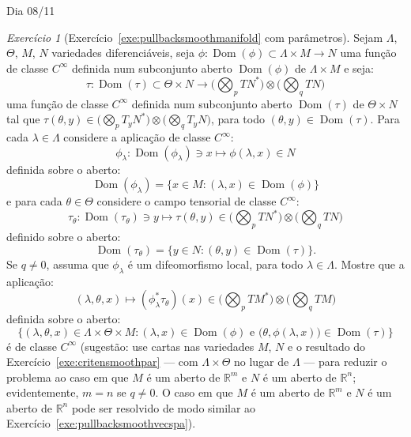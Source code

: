 \documentclass[oneside,11pt]{amsart}
\newcommand{\R}{\mathds R}
\DeclareMathOperator{\Dom}{Dom}
\theoremstyle{remark}\newtheorem{exercise}{Exercício}[section]
\theoremstyle{plain}\newtheorem{teo}{Teorema}[section]
\theoremstyle{plain}\newtheorem{lem}[teo]{Lema}
\theoremstyle{plain}\newtheorem{prop}[teo]{Proposição}
\theoremstyle{definition}\newtheorem{defin}[teo]{Definição}
\theoremstyle{remark}\newtheorem{rem}[teo]{Observação}
\theoremstyle{definition}\newtheorem{example}[teo]{Exemplo}
\numberwithin{equation}{section}
\begin{document}
\begin{section}{Dia 08/11}
\begin{exercise}[Exercício~\ref{exe:pullbacksmoothmanifold} com parâmetros]\label{exe:pullbackparametros}
Sejam $\Lambda$, $\Theta$, $M$, $N$ variedades diferenciáveis, seja $\phi:\Dom(\phi)\subset\Lambda\times M\to N$ uma função de classe $C^\infty$
definida num subconjunto aberto $\Dom(\phi)$ de $\Lambda\times M$ e seja:
\[\tau:\Dom(\tau)\subset\Theta\times N\longrightarrow\Big(\bigotimes_pTN^*\Big)\otimes\Big(\bigotimes_qTN\Big)\]
uma função de classe $C^\infty$ definida num subconjunto aberto $\Dom(\tau)$ de $\Theta\times N$ tal que
$\tau(\theta,y)\in\big(\bigotimes_pT_yN^*\big)\otimes\big(\bigotimes_qT_yN\big)$, para todo $(\theta,y)\in\Dom(\tau)$.
Para cada $\lambda\in\Lambda$ considere a aplicação de classe $C^\infty$:
\[\phi_\lambda:\Dom(\phi_\lambda)\ni x\longmapsto\phi(\lambda,x)\in N\]
definida sobre o aberto:
\[\Dom(\phi_\lambda)=\big\{x\in M:(\lambda,x)\in\Dom(\phi)\big\}\]
e para cada $\theta\in\Theta$ considere o campo tensorial de classe $C^\infty$:
\[\tau_\theta:\Dom(\tau_\theta)\ni y\longmapsto\tau(\theta,y)\in\Big(\bigotimes_pTN^*\Big)\otimes\Big(\bigotimes_qTN\Big)\]
definido sobre o aberto:
\[\Dom(\tau_\theta)=\big\{y\in N:(\theta,y)\in\Dom(\tau)\big\}.\]
Se $q\ne0$, assuma que $\phi_\lambda$ é um difeomorfismo local, para todo $\lambda\in\Lambda$.
Mostre que a aplicação:
\[(\lambda,\theta,x)\longmapsto(\phi_\lambda^*\tau_\theta)(x)\in\Big(\bigotimes_pTM^*\Big)\otimes\Big(\bigotimes_qTM\Big)\]
definida sobre o aberto:
\[\big\{(\lambda,\theta,x)\in\Lambda\times\Theta\times M:\text{$(\lambda,x)\in\Dom(\phi)$ e $\big(\theta,\phi(\lambda,x)\big)\in\Dom(\tau)$}\big\}\]
é de classe $C^\infty$ (sugestão: use cartas nas variedades $M$, $N$ e o resultado do Exercício~\ref{exe:critensmoothpar} --- com $\Lambda\times\Theta$
no lugar de $\Lambda$ --- para reduzir o problema ao caso em que
$M$ é um aberto de $\R^m$ e $N$ é um aberto de $\R^n$; evidentemente, $m=n$ se $q\ne0$. O caso em que $M$ é um aberto de $\R^m$ e $N$ é um aberto de $\R^n$
pode ser resolvido de modo similar ao Exercício~\ref{exe:pullbacksmoothvecspa}).
\end{exercise}


\end{section}
\end{document}
